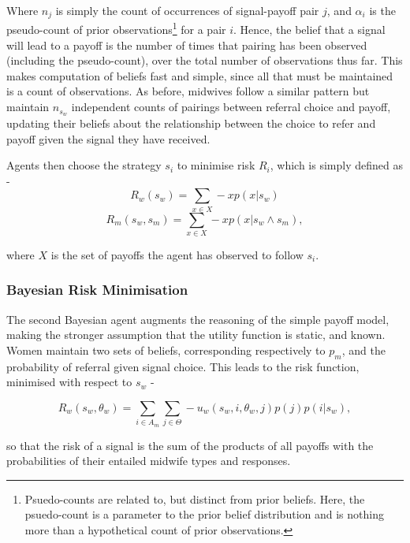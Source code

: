 Where \(n_{j}\) is simply the count of occurrences of signal-payoff pair \(j\), and \(\alpha_{i}\) is the pseudo-count of prior observations\footnote{Psuedo-counts are related to, but distinct from prior beliefs. Here, the psuedo-count is a parameter to the prior belief distribution and is nothing more than a hypothetical count of prior observations.} for a pair \(i\). Hence,
the belief that a signal will lead to a payoff is the number
of times that pairing has been observed (including the pseudo-count),
over the total number of observations thus far. This makes computation
of beliefs fast and simple, since all that must be maintained is
a count of observations.
As before, midwives follow a similar pattern but maintain \(n_{s_{w}}\) independent counts of pairings between referral choice and payoff, updating their beliefs about the relationship between the choice to refer and payoff given the signal they have received.

Agents then choose the strategy $s_{i}$ to minimise risk $R_{i}$, which is simply defined as - 
\begin{equation}
R_{w}(s_{w}) = \sum_{x \in X} -xp(x | s_{w})
\end{equation}
\begin{equation}
R_{m}(s_{w}, s_{m}) = \sum_{x \in X} -xp(x | s_{w}\wedge s_{m}),
\end{equation}

where $X$ is the set of payoffs the agent has observed to follow $s_{i}$.

\subsubsection{Bayesian Risk Minimisation}

The second Bayesian agent augments the reasoning of the simple payoff model, making the stronger assumption that the utility function is static, and known. Women maintain two sets of beliefs, corresponding respectively to \(p_{m}\), and the probability of referral given signal choice. This leads to the risk function, minimised with respect to \(s_{w}\) -

\begin{equation}
R_{w}(s_{w}, \theta_{w}) = \sum_{i\in A_{m}}\sum_{j\in \Theta} -u_{w}(s_{w}, i, \theta_{w}, j)p(j)p(i | s_{w}),
\end{equation}

so that the risk of a signal is the sum of the products of all payoffs with the probabilities of their entailed midwife types and responses.

